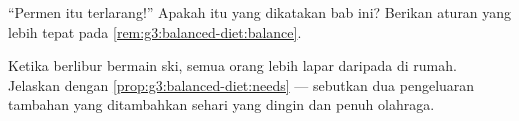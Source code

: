 \begin{exercise}[$\star\star$]\label{exo:g3:balanced-diet:9}
``Permen itu terlarang!'' Apakah itu yang dikatakan bab ini? Berikan
aturan yang lebih tepat pada \cref{rem:g3:balanced-diet:balance}.
\end{exercise}

\begin{exercise}[$\star\star$]\label{exo:g3:balanced-diet:10}
Ketika berlibur bermain ski, semua orang lebih lapar daripada di
rumah. Jelaskan dengan \cref{prop:g3:balanced-diet:needs} --- sebutkan
dua pengeluaran tambahan yang ditambahkan sehari yang dingin dan penuh
olahraga.
\end{exercise}
